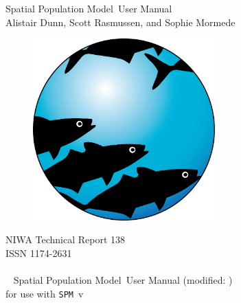 \documentclass[a4paper,11pt,twoside,pdftex]{article}
\newcommand{\DocYear}{\SourceControlYearDoc}
\newcommand{\DocVer}{\SourceControlDateDoc}
\newcommand{\VER}{v} %
\newcommand{\SPM}{\texttt{SPM}} %
\newcommand{\SPMName}{Spatial Population Model} %
\begin{document}
\sloppy %


\begin{titlepage}
  \thispagestyle{empty} %
	\begin{center}

		\vspace*{2cm}
		\Huge \SPMName\ User Manual \\

		\vspace{1cm}
		\LARGE Alistair Dunn, Scott Rasmussen, and Sophie Mormede \\ %

		\vspace{2cm}
		\begin{figure}[htp]
			\begin{center}
			 \includegraphics[height=7cm,width=7cm]{Figures/SPM}
			\end{center}
		\end{figure}
		\vspace{2cm}

		\Large NIWA Technical Report 138 \\%
		\Large ISSN 1174-2631 \\%
		\Large \DocYear \\%

		~\vfill
		\SPMName\ User Manual (modified: \DocVer) \\ for use with \SPM\ \VER

	\end{center}
\end{titlepage}
\end{document}
